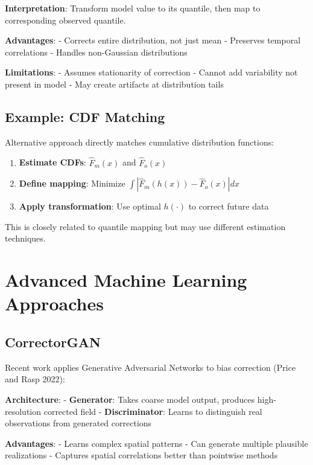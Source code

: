\documentclass[
  letterpaper,
  DIV=11,
  numbers=noendperiod]{scrreprt}
\providecommand{\tightlist}{%
  \setlength{\itemsep}{0pt}\setlength{\parskip}{0pt}}
\begin{document}
\textbf{Interpretation}: Transform model value to its quantile, then map
to corresponding observed quantile.

\textbf{Advantages}: - Corrects entire distribution, not just mean -
Preserves temporal correlations - Handles non-Gaussian distributions

\textbf{Limitations}: - Assumes stationarity of correction - Cannot add
variability not present in model - May create artifacts at distribution
tails

\subsection{Example: CDF Matching}\label{example-cdf-matching}

Alternative approach directly matches cumulative distribution functions:

\begin{enumerate}
\def\labelenumi{\arabic{enumi}.}
\tightlist
\item
  \textbf{Estimate CDFs}: \(\hat{F}_m(x)\) and \(\hat{F}_o(x)\)
\item
  \textbf{Define mapping}: Minimize
  \(\int |\hat{F}_m(h(x)) - \hat{F}_o(x)| dx\)
\item
  \textbf{Apply transformation}: Use optimal \(h(\cdot)\) to correct
  future data
\end{enumerate}

This is closely related to quantile mapping but may use different
estimation techniques.

\section{Advanced Machine Learning
Approaches}\label{advanced-machine-learning-approaches}

\subsection{CorrectorGAN}\label{correctorgan}

Recent work applies Generative Adversarial Networks to bias correction
(Price and Rasp 2022):

\textbf{Architecture}: - \textbf{Generator}: Takes coarse model output,
produces high-resolution corrected field - \textbf{Discriminator}:
Learns to distinguish real observations from generated corrections

\textbf{Advantages}: - Learns complex spatial patterns - Can generate
multiple plausible realizations - Captures spatial correlations better
than pointwise methods
\end{document}
